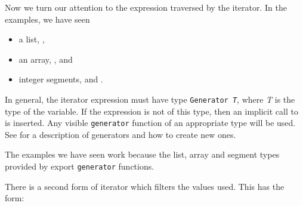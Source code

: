 Now we turn our attention to the expression traversed by the
 iterator.
In the examples, we have seen
\begin{itemize}
\item a list, ,
\item an array, , and
\item integer segments,  and .
\end{itemize}

In general, the  iterator expression must have type
{\tt Generator {\em T\/}}, where {\em T\/} is the type of the 
 variable.   If the expression is not of this type,
then an implicit call to  is inserted.
Any visible \verb"generator" function of an appropriate type will be used.
See  for a description of generators and how
to create new ones.

The examples we have seen work because the list, array
and segment types provided by \libaldor{} export \verb"generator"
functions.


There is a second form of  iterator which filters the
values used.  This has the form:


